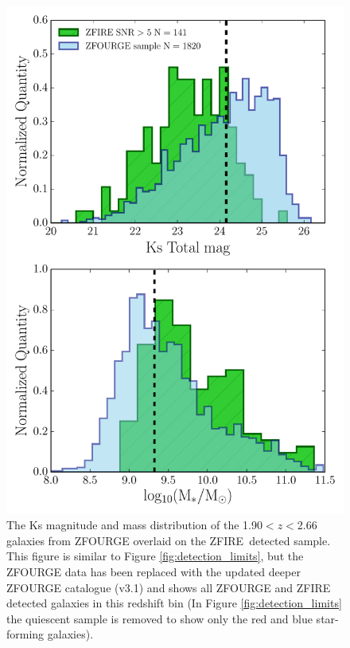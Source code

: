 \documentclass[iop]{emulateapj}
\begin{document}
\begin{figure}[b]
\centering
\includegraphics[trim = 10 10 10 5, clip, scale=0.90]{figures/detected_limits_newcat.pdf}
\caption{The Ks magnitude and mass distribution of the 1.90$<z<$2.66 galaxies from ZFOURGE overlaid on the ZFIRE\ detected sample.
This figure is similar to Figure \ref{fig:detection_limits}, but the ZFOURGE data has been replaced with the updated deeper ZFOURGE catalogue (v3.1) and shows all ZFOURGE and ZFIRE detected galaxies in this redshift bin (In Figure \ref{fig:detection_limits} the quiescent sample is removed to show only the red and blue star-forming galaxies). 
}
\label{fig:detection_limits_newcat}
\end{figure}
\end{document}
